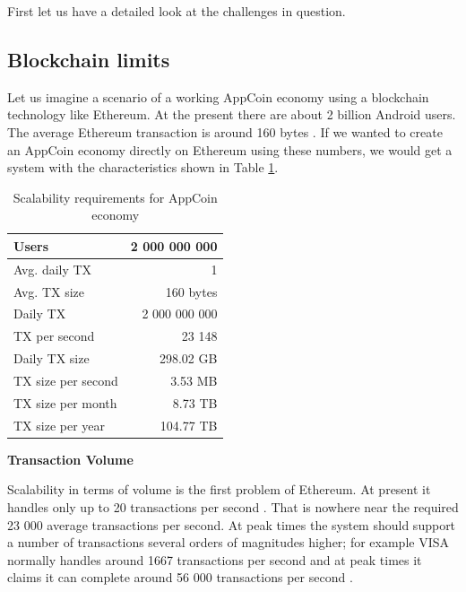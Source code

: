 \medskip

First let us have a detailed look at the challenges in question.

\subsection{Blockchain limits}

Let us imagine a scenario of a working AppCoin economy using a blockchain technology like Ethereum. At the present there are about 2 billion Android users. The average Ethereum transaction is around 160 bytes \cite{EthereumTransactions}. If we wanted to create an AppCoin economy directly on Ethereum using these numbers, we would get a system with the characteristics shown in Table \ref{table:ethereumscalability}.

\begin{table}[!htbp]
\centering
\begin{tabular}{|l|r|}
\hline
Users              & 2 000 000 000    \\ \hline
Avg. daily TX      & 1                \\ \hline
Avg. TX size       & 160 bytes        \\ \hline
Daily TX           & 2 000 000 000    \\ \hline
TX per second      & 23 148           \\ \hline
Daily TX size      & 298.02 GB        \\ \hline
TX size per second & 3.53 MB          \\ \hline
TX size per month  & 8.73 TB          \\ \hline
TX size per year   & 104.77 TB        \\ \hline
\end{tabular}
\caption{Scalability requirements for AppCoin economy}
\label{table:ethereumscalability}
\end{table}

\medskip

{\bf Transaction Volume}

Scalability in terms of volume is the first problem of Ethereum. At present it handles only up to 20 transactions per second \cite{eth_scaling}. That is nowhere near the required 23 000 average transactions per second. At peak times the system should support a number of transactions several orders of magnitudes higher; for example VISA normally handles around 1667 transactions per second and at peak times it claims it can complete around 56 000 transactions per second \cite{eth_scaling}.


